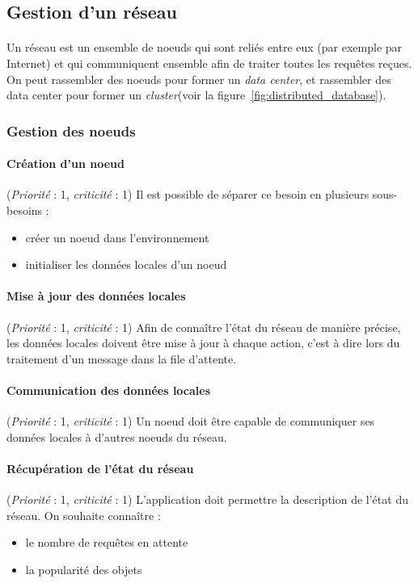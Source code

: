\documentclass[12pt]{article}
\newcommand{\besoin}[2] {
  (\textit{Priorité} : #1, \textit{criticité} : #2)
}
\begin{document}
\subsection{Gestion d'un réseau}

\paragraph{} Un réseau est un ensemble de noeuds qui sont reliés entre eux (par exemple par Internet) et qui communiquent ensemble afin de traiter toutes les requêtes reçues. On peut rassembler des noeuds pour former un \textit{data center}, et rassembler des data center pour former un \textit{cluster}(voir la figure~\ref{fig:distributed_database}).


\subsubsection{Gestion des noeuds}

\paragraph{Création d'un noeud} \besoin{1}{1} Il est possible de séparer ce besoin en plusieurs sous-besoins :
 \begin{itemize}
 	\item créer un noeud dans l'environnement
 	\item initialiser les données locales d'un noeud
 \end{itemize}

\paragraph{Mise à jour des données locales} \besoin{1}{1} Afin de connaître l'état du réseau de manière précise, les données locales doivent être mise à jour à chaque action,
c'est à dire lors du traitement d'un message dans la file d'attente.


\paragraph{Communication des données locales} \besoin{1}{1} Un noeud doit être capable de communiquer ses données locales à d'autres noeuds du réseau.

\paragraph{Récupération de l'état du réseau} \besoin{1}{1} L'application doit permettre la description de l'état du réseau.
On souhaite connaître : 
\begin{itemize}
 \item le nombre de requêtes en attente
 \item la popularité des objets
\end{itemize}
\end{document}
